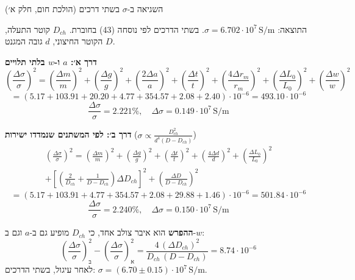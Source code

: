 \documentclass[11pt,a4paper]{article}
\newcommand{\U}[1]{\,\mathrm{#1}}
\begin{document}
\begin{center}\large השגיאה ב-$\sigma$ בשתי דרכים (הולכת חום, חלק א׳)\end{center}

התוצאה: $\sigma = 6.702 \cdot 10^7 \U{S/m}$. בשתי הדרכים לפי נוסחה (43) בחוברת. $D_{ch}$ קוטר התעלה, $D$ הקוטר החיצוני, $d$ גובה המגנט.

\textbf{דרך א׳: $a$ ו-$w$ בלתי תלויים}
\[ \left(\frac{\Delta\sigma}{\sigma}\right)^2 = \left(\frac{\Delta m}{m}\right)^2 + \left(\frac{\Delta g}{g}\right)^2 + \left(\frac{2\Delta a}{a}\right)^2 + \left(\frac{\Delta t}{t}\right)^2 + \left(\frac{4\Delta r_m}{r_m}\right)^2 + \left(\frac{\Delta L_0}{L_0}\right)^2 + \left(\frac{\Delta w}{w}\right)^2 \]
\[ = (5.17 + 103.91 + 20.20 + 4.77 + 354.57 + 2.08 + 2.40) \cdot 10^{-6} = 493.10 \cdot 10^{-6} \]
\[ \frac{\Delta\sigma}{\sigma} = 2.221\%, \quad \Delta\sigma = 0.149 \cdot 10^7 \U{S/m} \]

\textbf{דרך ב׳: לפי המשתנים שנמדדו ישירות} ($\sigma \propto \frac{D_{ch}^2}{d^4 (D - D_{ch})}$)
\begin{multline*}
\left(\frac{\Delta\sigma}{\sigma}\right)^2 = \left(\frac{\Delta m}{m}\right)^2 + \left(\frac{\Delta g}{g}\right)^2 + \left(\frac{\Delta t}{t}\right)^2 + \left(\frac{4\Delta d}{d}\right)^2 + \left(\frac{\Delta L_0}{L_0}\right)^2 \\
+ \left[\left(\frac{2}{D_{ch}} + \frac{1}{D - D_{ch}}\right)\Delta D_{ch}\right]^2 + \left(\frac{\Delta D}{D - D_{ch}}\right)^2
\end{multline*}
\[ = (5.17 + 103.91 + 4.77 + 354.57 + 2.08 + 29.88 + 1.46) \cdot 10^{-6} = 501.84 \cdot 10^{-6} \]
\[ \frac{\Delta\sigma}{\sigma} = 2.240\%, \quad \Delta\sigma = 0.150 \cdot 10^7 \U{S/m} \]

\textbf{ההפרש} הוא איבר צולב אחד, כי $D_{ch}$ מופיע גם ב-$a$ וגם ב-$w$:
\[ \left(\frac{\Delta\sigma}{\sigma}\right)^2_{\text{ב}} - \left(\frac{\Delta\sigma}{\sigma}\right)^2_{\text{א}} = \frac{4\,(\Delta D_{ch})^2}{D_{ch}\,(D - D_{ch})} = 8.74 \cdot 10^{-6} \]
לאחר עיגול, בשתי הדרכים: $\sigma = (6.70 \pm 0.15) \cdot 10^7 \U{S/m}$.
\end{document}
